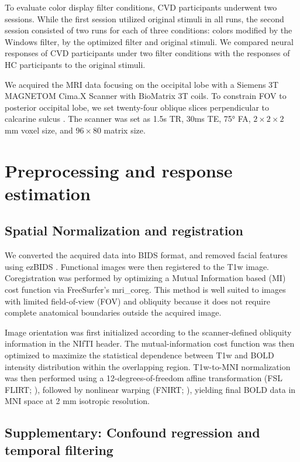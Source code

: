To evaluate color display filter conditions, CVD participants underwent two sessions. While the first session utilized original stimuli in all runs, the second session consisted of two runs for each of three conditions: colors modified by the Windows filter, by the optimized filter and original stimuli. We compared neural responses of CVD participants under two filter conditions with the responses of HC participants to the original stimuli.

We acquired the MRI data focusing on the occipital lobe with a Siemens 3T MAGNETOM Cima.X Scanner with BioMatrix 3T coils. To constrain FOV to posterior occipital lobe, we set twenty-four oblique slices perpendicular to calcarine sulcus \cite{ryu2024}. The scanner was set as 1.5s TR, 30ms TE, 75° FA, $2 \times 2 \times 2$ mm voxel size, and $96 \times 80$ matrix size.

\section{Preprocessing and response estimation}

\subsection*{Spatial Normalization and registration}

We converted the acquired data into BIDS format, and removed facial features using ezBIDS \cite{levitas2024}. Functional images were then registered to the T1w image. Coregistration was performed by optimizing a Mutual Information based (MI) cost function \cite{maes1997, wells1996} via FreeSurfer's mri\_coreg. This method is well suited to images with limited field-of-view (FOV) and obliquity because it does not require complete anatomical boundaries outside the acquired image.

Image orientation was first initialized according to the scanner-defined obliquity information in the NIfTI header. The mutual-information cost function was then optimized to maximize the statistical dependence between T1w and BOLD intensity distribution within the overlapping region. T1w-to-MNI normalization was then performed using a 12-degrees-of-freedom affine transformation (FSL FLIRT; ), followed by nonlinear warping (FNIRT; ), yielding final BOLD data in MNI space at 2 mm isotropic resolution.

\subsection*{Supplementary: Confound regression and temporal filtering}


